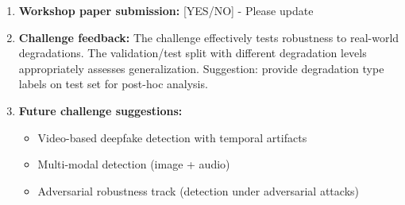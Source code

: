 \documentclass{article}
\begin{document}
\begin{enumerate}[label=\alph*)]
\item \textbf{Workshop paper submission:} [YES/NO] - Please update

\item \textbf{Challenge feedback:} The challenge effectively tests robustness to real-world degradations. The validation/test split with different degradation levels appropriately assesses generalization. Suggestion: provide degradation type labels on test set for post-hoc analysis.

\item \textbf{Future challenge suggestions:} 
\begin{itemize}
    \item Video-based deepfake detection with temporal artifacts
    \item Multi-modal detection (image + audio)
    \item Adversarial robustness track (detection under adversarial attacks)
\end{itemize}
\end{enumerate}
\end{document}
